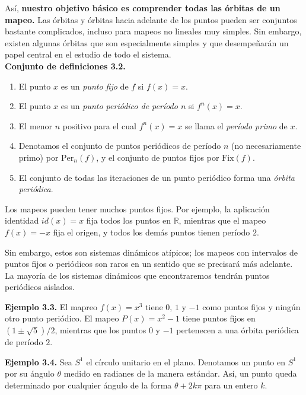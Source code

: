 \documentclass[10pt,a4paper]{article}
\begin{document}
Así, \textbf{nuestro objetivo básico es comprender todas las órbitas de un mapeo.} Las órbitas y órbitas hacia adelante de los puntos pueden ser conjuntos bastante complicados, incluso para mapeos no lineales muy simples. Sin embargo, existen algunas órbitas que son especialmente simples y que desempeñarán un papel 
central en el estudio de todo el sistema.
\\

\textbf{Conjunto de definiciones 3.2.} 
\begin{enumerate}
	\item El punto $x$ es un \emph{punto fijo} de $f$ si $f(x)=x$.  
	\item El punto $x$ es un \emph{punto periódico de período $n$} si $f^{n}(x)=x$.  
	\item El menor $n$ positivo para el cual $f^{n}(x)=x$ se llama el \emph{período primo} de $x$.  
	\item Denotamos el conjunto de puntos periódicos de período $n$ (no necesariamente primo) por $\mathrm{Per}_{n}(f)$, y el conjunto de puntos fijos por $\mathrm{Fix}(f)$. 
	\item El conjunto de todas las iteraciones de un punto periódico forma una \emph{órbita periódica}.  
\end{enumerate}

Los mapeos pueden tener muchos puntos fijos.  
Por ejemplo, la aplicación identidad $id(x)=x$ fija todos los puntos en $\mathbb{R}$,  
mientras que el mapeo $f(x)=-x$ fija el origen, y todos los demás puntos tienen período $2$.  

Sin embargo, estos son sistemas dinámicos atípicos;  
los mapeos con intervalos de puntos fijos o periódicos son raros en un sentido que se precisará más adelante.  
La mayoría de los sistemas dinámicos que encontraremos tendrán puntos periódicos aislados.


\newpage

\textbf{Ejemplo 3.3.} El mapreo $f(x) = x^{3}$ tiene $0,\,1$ y $-1$ como puntos fijos 
y ningún otro punto periódico.  
El mapeo $P(x) = x^{2}-1$ tiene puntos fijos en $(1 \pm \sqrt{5})/2$, 
mientras que los puntos $0$ y $-1$ pertenecen a una órbita periódica de período $2$.

\medskip

\textbf{Ejemplo 3.4.} Sea $S^{1}$ el círculo unitario en el plano. Denotamos un punto en $S^{1}$ por su ángulo $\theta$ medido en radianes de la manera estándar. Así, un punto queda determinado por cualquier ángulo de la forma $\theta + 2k\pi$ para un entero $k$.  
\end{document}

